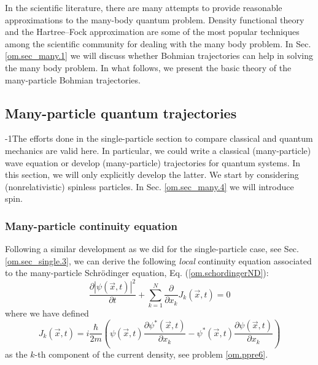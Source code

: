 \documentclass[nofootinbib, secnumarabic, amsmath, nobibnotes,10pt,aps,pra]{revtex4-1}
\newcommand{\sref}[1]{Sec. \ref{#1}}
\newcommand{\eref}[1]{Eq. (\ref{#1})}
\begin{document}
In the scientific literature, there are many attempts to provide
reasonable approximations to the many-body quantum problem. Density
functional theory \cite{om.kohn1964,om.kohn1965} and the
Hartree--Fock approximation \cite{om.Hartree,om.Hartree2,om.Fock} are
some of the most popular techniques among the scientific community
for dealing with the many body problem. In \sref{om.sec_many.1} we
will discuss whether Bohmian trajectories can help in solving the
many body problem. In what follows, we present the basic theory of
the many-particle Bohmian trajectories.

\subsection{Many-particle quantum trajectories}\label{om.sec_many.2}

\looseness-1The efforts done in the single-particle section to compare classical
and quantum mechanics are valid here. In particular, we could write
a classical (many-particle) wave equation or develop (many-particle)
trajectories for quantum systems. In this section, we will only
explicitly develop the latter. We start by considering
(nonrelativistic) spinless particles. In \sref{om.sec_many.4} we
will introduce spin.

\subsubsection{Many-particle continuity equation}

Following a similar development as we did for the single-particle
case, see \sref{om.sec_single.3}, we can derive the following
\textit{local} continuity equation associated to the many-particle
Schr\"odinger equation, \eref{om.schordingerND}:
\begin{equation}
\label{om.continuityND}
 \frac{\partial |\psi(\vec{x},t)|^2} {\partial t} + \sum_{k = 1}^{N} \frac { \partial}  {\partial x_k}  J_k(\vec{x},t) = 0  
\end{equation}
where we have defined
\begin{equation}
\label{om.currentND}
J_k(\vec{x},t) = i \frac {\hbar} {2 m} \left(\psi(\vec{x},t) \frac {\partial \psi^{*}(\vec{x},t)} {\partial x_k}- \psi^{*}(\vec{x},t) \frac {\partial \psi(\vec{x},t)} {\partial x_k} \right)
\end{equation}
as the $k$-th component of the current density, see problem \ref{om.ppre6}.
\end{document}
